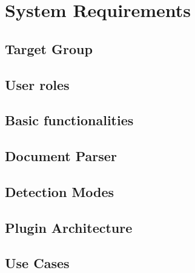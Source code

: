 \chapter{System Requirements}

\section{Target Group}

\section{User roles}

\section{Basic functionalities}

\section{Document Parser}

\section{Detection Modes}

\section{Plugin Architecture}

\section{Use Cases}
